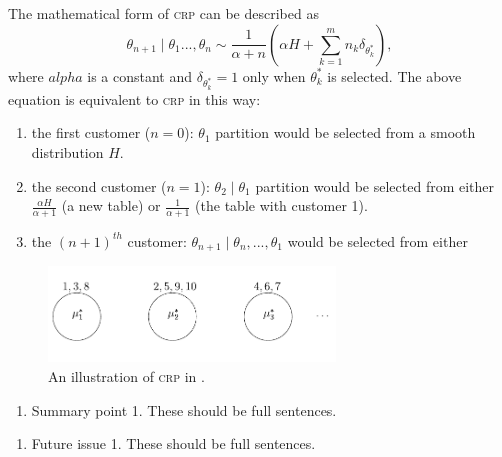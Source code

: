 \documentclass{ar-1col}
\begin{document}
The mathematical form of \textsc{crp} can be described as 
\begin{equation}
    \theta_{n+1} \mid \theta_1 ..., \theta_{n} \sim \frac{1}{\alpha + n} \left( \alpha H + \sum_{k = 1}^{m} n_k \delta_{\theta_{k}^*} \right),
    \label{eq:crp}
\end{equation}
where $alpha$ is a constant and $\delta_{\theta_k^*} = 1$ only when $\theta_k^*$ is selected.
The above equation is equivalent to \textsc{crp} in this way: 
\begin{enumerate}
    \item the first customer ($n = 0$): $\theta_1$ partition would be selected from a smooth distribution $H$.
    \item the second customer ($n = 1$): $\theta_2 \mid \theta_1$ partition would be selected from either $\frac{\alpha H}{\alpha + 1}$ (a new table) or $\frac{1}{\alpha + 1}$ (the table with customer 1).
    \item the $(n + 1)^{th}$ customer: $\theta_{n + 1} \mid \theta_n, ..., \theta_1$ would be selected from either 
\end{enumerate}



\begin{figure}
    \includegraphics[width=3in, height=1in]{images/chinese_restaurant.pdf}
    \caption{An illustration of \textsc{crp} in \citet{Blei2007}.}
    \label{fig:crp}
\end{figure}

\begin{summary}
\begin{enumerate}
\item Summary point 1. These should be full sentences.
\end{enumerate}
\end{summary}

\begin{issues}
\begin{enumerate}
\item Future issue 1. These should be full sentences.
\end{enumerate}
\end{issues}
\end{document}
